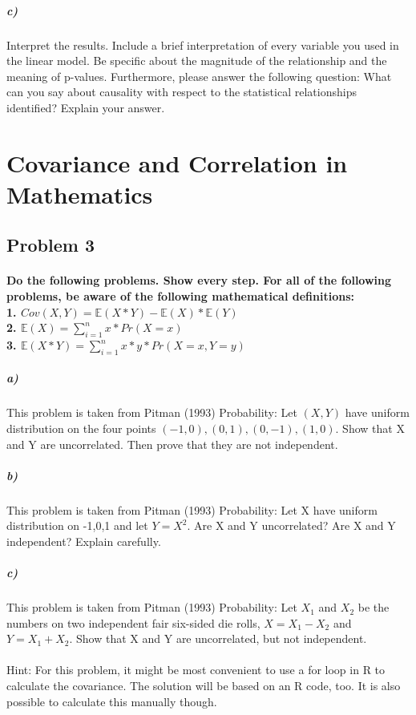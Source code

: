 \documentclass[12pt,letter]{article}
\begin{document}
\subparagraph{c)} Interpret the results. Include a brief interpretation of every variable you used in the linear model. Be specific about the magnitude of the relationship and the meaning of p-values. Furthermore, please answer the following question: What can you say about causality with respect to the statistical relationships identified? Explain your answer.



\section*{Covariance and Correlation in Mathematics}

\subsection*{Problem 3}

\paragraph{Do the following problems. Show every step. For all of the following problems, be aware of the following mathematical definitions:
	\bigskip
\\1. $Cov(X, Y) = \mathbb{E}(X*Y)-\mathbb{E}(X)*\mathbb{E}(Y)$
\\2. $\mathbb{E}(X) = \sum_{i=1}^{n} x * Pr(X=x)$
\\3. $\mathbb{E}(X*Y) = \sum_{i=1}^{n} x *y* Pr(X=x, Y=y)$}

\subparagraph{a)} This problem is taken from Pitman (1993) Probability: Let $(X,Y)$ have uniform distribution on the four points $(-1,0), (0,1), (0,-1), (1,0)$. Show that X and Y are uncorrelated. Then prove that they are not independent. %

\subparagraph{b)} This problem is taken from Pitman (1993) Probability: Let X have uniform distribution on {-1,0,1} and let $Y=X^2$. Are X and Y uncorrelated? Are X and Y independent? Explain carefully. %

\subparagraph{c)} This problem is taken from Pitman (1993) Probability: Let $X_{1}$ and $X_{2} $ be the numbers on two independent fair six-sided die rolls, $X = X_{1} - X_{2}$ and $Y= X_{1} + X_{2}$. Show that X and Y are uncorrelated, but not independent. %

\paragraph{} Hint: For this problem, it might be most convenient to use a for loop in R to calculate the covariance. The solution will be based on an R code, too. It is also possible to calculate this manually though.
\end{document}
